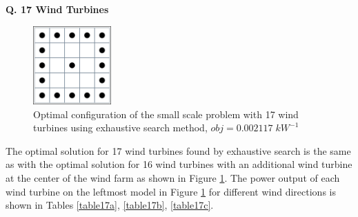     \textbf{Q. 17 Wind Turbines}
        \begin{figure}[H]
            \centering
            \includegraphics[width=3cm]{Figures/Chromosomes/17.png}
            \caption{Optimal configuration of the small scale problem with 17 wind turbines using exhaustive search method, $obj=0.002117\;kW^{-1}$}
            \label{small17}
        \end{figure}
        
        The optimal solution for 17 wind turbines found by exhaustive search is the same as with the optimal solution for 16 wind turbines with an additional wind turbine at the center of the wind farm as shown in Figure \ref{small17}. The power output of each wind turbine on the leftmost model in Figure \ref{small17} for different wind directions is shown in Tables \ref{table17a}, \ref{table17b}, \ref{table17c}.
        

